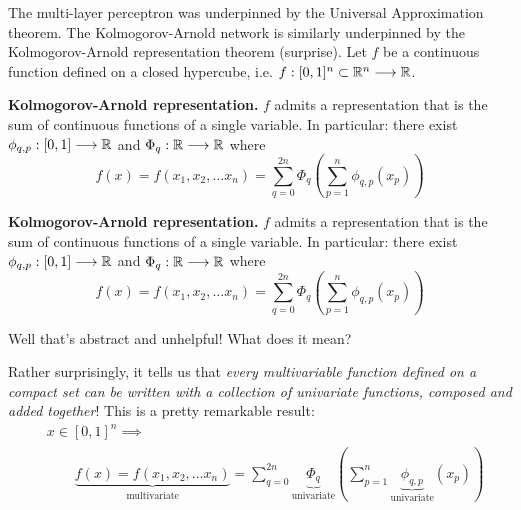 \begin{frame}
    The multi-layer perceptron was underpinned by the Universal Approximation theorem. The Kolmogorov-Arnold network is
    similarly underpinned by the Kolmogorov-Arnold representation theorem (surprise). 
    Let $f$ be a continuous function defined on a closed hypercube, i.e. $f : [0,1]^n \subset \mathbb{R}^n \longrightarrow \mathbb{R}$.
    \begin{theorem}
        \textbf{Kolmogorov-Arnold representation.} $f$ admits a representation that is the sum of continuous
        functions of a single variable. In particular: there exist $\phi_{q, p} : [0, 1] \longrightarrow \mathbb{R}$
        and $\Phi_q: \mathbb{R} \longrightarrow \mathbb{R}$ where
        \[
            f(x) = f(x_1, x_2, \ldots x_n) = \sum_{q=0}^{2n} \Phi_q \left(
                \sum_{p=1}^n \phi_{q, p} (x_p)
                \right)
        \]
    \end{theorem}
\end{frame}

\begin{frame}
    \begin{theorem}
        \textbf{Kolmogorov-Arnold representation.} $f$ admits a representation that is the sum of continuous
        functions of a single variable. In particular: there exist $\phi_{q, p} : [0, 1] \longrightarrow \mathbb{R}$
        and $\Phi_q: \mathbb{R} \longrightarrow \mathbb{R}$ where
        \[
            f(x) = f(x_1, x_2, \ldots x_n) = \sum_{q=0}^{2n} \Phi_q \left(
                \sum_{p=1}^n \phi_{q, p} (x_p)
                \right)
        \]
    \end{theorem}
    Well that's abstract and unhelpful! What does it mean?
\end{frame}

\begin{frame}
    Rather surprisingly, it tells us that \textit{every multivariable function defined on a compact set
    can be written with a collection of univariate functions, composed and added together}! This is a pretty 
    remarkable result:
    \begin{align*}
        & x \in [0, 1]^n \implies \\
        & \qquad \underbrace{f(x) = f(x_1, x_2, \ldots x_n)}_{\text{multivariate}}
        = \sum_{q=0}^{2n} \underbrace{\Phi_q}_{\text{univariate}} \left(
            \sum_{p=1}^n \underbrace{\phi_{q, p}}_{\text{univariate}} (x_p)
            \right)
    \end{align*}
\end{frame}

